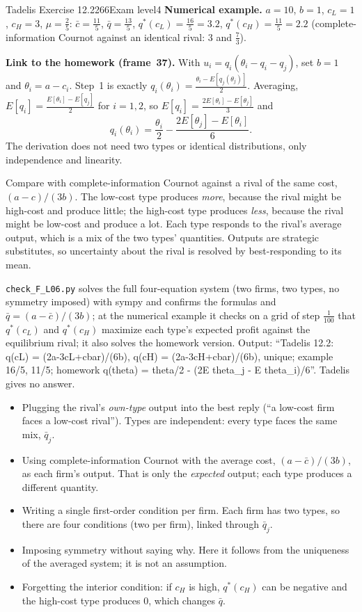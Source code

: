 \begin{exsol}{Tadelis Exercise 12.2}{266}{Exam level}{4}
\textbf{Numerical example.} $a = 10$, $b = 1$, $c_L = 1$, $c_H = 3$, $\mu = \frac25$: $\bar c = \frac{11}5$,
$\bar q = \frac{13}{5}$, $q^*(c_L) = \frac{16}{5} = 3.2$, $q^*(c_H) = \frac{11}{5} = 2.2$
(complete-information Cournot against an identical rival: $3$ and $\frac73$).

\textbf{Link to the homework (frame~37).} With $u_i = q_i(\theta_i - q_i - q_j)$, set $b = 1$ and
$\theta_i = a - c_i$. Step~1 is exactly $q_i(\theta_i) = \frac{\theta_i - E[q_j(\theta_j)]}{2}$. Averaging,
$E[q_i] = \frac{E[\theta_i] - E[q_j]}{2}$ for $i = 1,2$, so $E[q_i] = \frac{2E[\theta_i] - E[\theta_j]}{3}$ and
\[
  q_i(\theta_i) = \frac{\theta_i}{2} - \frac{2E[\theta_j] - E[\theta_i]}{6}.
\]
The derivation does not need two types or identical distributions, only independence and linearity.

\interp Compare with complete-information Cournot against a rival of the same cost, $(a - c)/(3b)$. The
low-cost type produces \emph{more}, because the rival might be high-cost and produce little; the
high-cost type produces \emph{less}, because the rival might be low-cost and produce a lot. Each type
responds to the rival's average output, which is a mix of the two types' quantities. Outputs are
strategic substitutes, so uncertainty about the rival is resolved by best-responding to its mean.

\verify \texttt{check\_F\_L06.py} solves the full four-equation system (two firms, two types, no
symmetry imposed) with sympy and confirms the formulas and $\bar q = (a - \bar c)/(3b)$; at the numerical
example it checks on a grid of step $\frac1{100}$ that $q^*(c_L)$ and $q^*(c_H)$ maximize each type's
expected profit against the equilibrium rival; it also solves the homework version. Output: ``Tadelis
12.2: q(cL) = (2a-3cL+cbar)/(6b), q(cH) = (2a-3cH+cbar)/(6b), unique; example 16/5, 11/5; homework
q(theta) = theta/2 - (2E theta\_j - E theta\_i)/6''. Tadelis gives no answer.

\mistakes
\begin{itemize}
  \item Plugging the rival's \emph{own-type} output into the best reply (``a low-cost firm faces a
  low-cost rival''). Types are independent: every type faces the same mix, $\bar q_j$.
  \item Using complete-information Cournot with the average cost, $(a - \bar c)/(3b)$, as each firm's
  output. That is only the \emph{expected} output; each type produces a different quantity.
  \item Writing a single first-order condition per firm. Each firm has two types, so there are four
  conditions (two per firm), linked through $\bar q_j$.
  \item Imposing symmetry without saying why. Here it follows from the uniqueness of the averaged
  system; it is not an assumption.
  \item Forgetting the interior condition: if $c_H$ is high, $q^*(c_H)$ can be negative and the
  high-cost type produces $0$, which changes $\bar q$.
\end{itemize}


\end{exsol}
